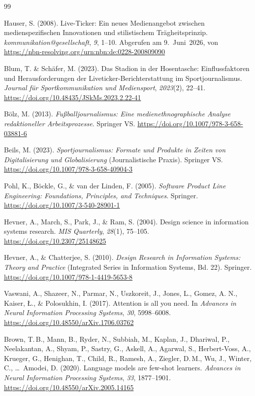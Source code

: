 \begin{thebibliography}{99}

  Hauser, S. (2008). Live-Ticker: Ein neues Medienangebot zwischen medienspezifischen Innovationen und stilistischem Trägheitsprinzip. \textit{kommunikation@gesellschaft}, \textit{9}, 1--10. Abgerufen am 9.~Juni~2026, von \url{https://nbn-resolving.org/urn:nbn:de:0228-200809090}

  Blum, T. \& Schäfer, M. (2023). Das Stadion in der Hosentasche: Einflussfaktoren und Herausforderungen der Liveticker-Berichterstattung im Sportjournalismus. \textit{Journal für Sportkommunikation und Mediensport}, \textit{2023}(2), 22--41. \url{https://doi.org/10.48435/JSkMs.2023.2.22-41}

  Bölz, M. (2013). \textit{Fußballjournalismus: Eine medienethnographische Analyse redaktioneller Arbeitsprozesse}. Springer VS. \url{https://doi.org/10.1007/978-3-658-03881-6}

  Beils, M. (2023). \textit{Sportjournalismus: Formate und Produkte in Zeiten von Digitalisierung und Globalisierung} (Journalistische Praxis). Springer VS. \url{https://doi.org/10.1007/978-3-658-40904-3}

  Pohl, K., Böckle, G., \& van der Linden, F. (2005). \textit{Software Product Line Engineering: Foundations, Principles, and Techniques}. Springer. \url{https://doi.org/10.1007/3-540-28901-1}

  Hevner, A., March, S., Park, J., \& Ram, S. (2004). Design science in information systems research. \textit{MIS Quarterly}, \textit{28}(1), 75--105. \url{https://doi.org/10.2307/25148625}

  Hevner, A., \& Chatterjee, S. (2010). \textit{Design Research in Information Systems: Theory and Practice} (Integrated Series in Information Systems, Bd. 22). Springer. \url{https://doi.org/10.1007/978-1-4419-5653-8}

  Vaswani, A., Shazeer, N., Parmar, N., Uszkoreit, J., Jones, L., Gomez, A. N., Kaiser, Ł., \& Polosukhin, I. (2017). Attention is all you need. In \textit{Advances in Neural Information Processing Systems}, \textit{30}, 5998--6008. \url{https://doi.org/10.48550/arXiv.1706.03762}

  Brown, T.\,B., Mann, B., Ryder, N., Subbiah, M., Kaplan, J., Dhariwal, P., Neelakantan, A., Shyam, P., Sastry, G., Askell, A., Agarwal, S., Herbert-Voss, A., Krueger, G., Henighan, T., Child, R., Ramesh, A., Ziegler, D.\,M., Wu, J., Winter, C., \ldots\ Amodei, D. (2020). Language models are few-shot learners. \textit{Advances in Neural Information Processing Systems}, \textit{33}, 1877--1901. \url{https://doi.org/10.48550/arXiv.2005.14165}


\end{thebibliography}
